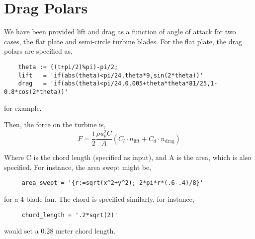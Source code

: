 \documentclass{article}
\begin{document}
\newpage
\section{Drag Polars}

We have been provided lift and drag as a function of angle of attack for
two cases, the flat plate and semi-circle turbine blades. 
For the flat plate, the drag polars are specified as,

\begin{lstlisting}
    theta := ((t+pi/2)%pi)-pi/2; 
    lift   = 'if(abs(theta)<pi/24,theta*9,sin(2*theta))'
    drag   = 'if(abs(theta)<pi/24,0.005+theta*theta*81/25,1-0.8*cos(2*theta))'
\end{lstlisting}
for example. 

Then, the force on the turbine is, 
\begin{equation}
 \boxed{F = \frac{1}{2}\frac{\rho u_p^2 C}{A}\left(C_l \cdot
					      n_\text{lift} + C_d \cdot n_\text{drag}  \right)}
\end{equation}

Where C is the chord length (specified as input), and A is the area,
which is also specified. For instance, the area swept might be, 
\begin{lstlisting}
     area_swept = '{r:=sqrt(x^2+y^2); 2*pi*r*(.6-.4)/8}'
\end{lstlisting}
for a 4 blade fan. The chord is specified similarly, for instance, 
\begin{lstlisting}
     chord_length = '.2*sqrt(2)'
\end{lstlisting}
would set a 0.28 meter chord length. 
%



\end{document}

